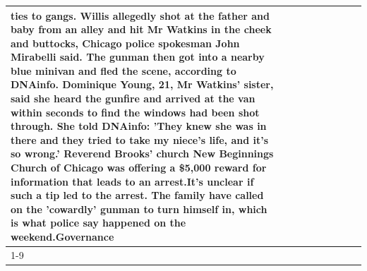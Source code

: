 \begin{table}[H]
\begin{tabular}{lllrlllll}
ties to gangs. Willis allegedly shot at the father and baby from an alley and hit Mr Watkins in the cheek and buttocks, Chicago police spokesman John Mirabelli said. The gunman then got into a nearby blue minivan and fled the scene, according to DNAinfo. Dominique Young, 21, Mr Watkins' sister, said she heard the gunfire and arrived at the van within seconds to find the windows had been shot through. She told DNAinfo: 'They knew she was in there and they tried to take my niece's life, and it's so wrong.' Reverend Brooks' church New Beginnings Church of Chicago was offering a \$5,000 reward for information that leads to an arrest.It's unclear if such a tip led to the arrest. The family have called on the 'cowardly' gunman to turn himself in, which is what police say happened on the weekend.Governance \\
\cline{1-9}

\end{tabular}
\end{table}
